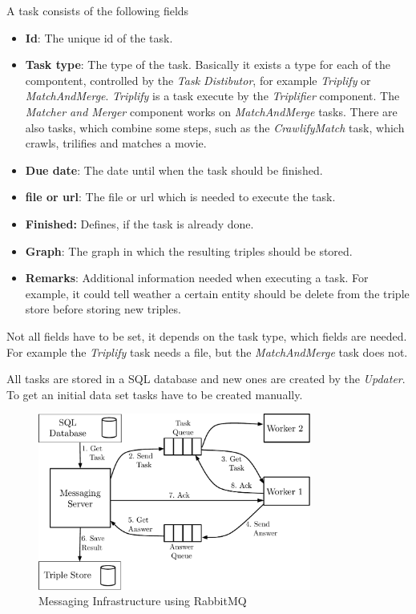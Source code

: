 A task consists of the following fields
\begin{itemize}
  \item \textbf{Id}:
  The unique id of the task.
  \item \textbf{Task type}:
   The type of the task.
  Basically it exists a type for each of the compontent, controlled by the \textit{Task Distibutor}, for example \textit{Triplify} or \textit{MatchAndMerge}.
  \textit{Triplify} is a task execute by the \textit{Triplifier} component.
  The \textit{Matcher and Merger} component works on \textit{MatchAndMerge} tasks.
  There are also tasks, which combine some steps, such as the \textit{CrawlifyMatch} task, which crawls, trilifies and matches a movie.
  \item \textbf{Due date}:
  The date until when the task should be finished.
  \item \textbf{file or url}:
  The file or url which is needed to execute the task.
  \item \textbf{Finished:}
  Defines, if the task is already done.
  \item \textbf{Graph}:
  The graph in which the resulting triples should be stored.
  \item \textbf{Remarks}:
  Additional information needed when executing a task.
  For example, it could tell weather a certain entity should be delete from the triple store before storing new triples.
\end{itemize}
Not all fields have to be set, it depends on the task type, which fields are needed.
For example the \textit{Triplify} task needs a file, but the \textit{MatchAndMerge} task does not.

All tasks are stored in a SQL database and new ones are created by the \textit{Updater}.
To get an initial data set tasks have to be created manually.

\begin{figure}[ht]
  \begin{center}
  \includegraphics[width=0.8\textwidth]{images/rabbit_mq.pdf}
  \end{center}
  \caption{Messaging Infrastructure using RabbitMQ}
  \label{fig_messaging_infrastructure}
\end{figure}

